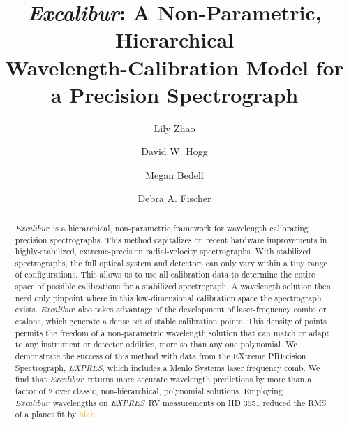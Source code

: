 \documentclass[modern]{aastex63}
\newcommand{\project}[1]{\textsl{#1}}
\newcommand{\name}{\project{Excalibur}}
\newcommand{\acronym}[1]{{\small{#1}}}
\newcommand{\expres}{\project{\acronym{EXPRES}}}
\newcommand{\lz}[1]{\textcolor{orange}{#1}}
\begin{document}
\title{\name:
  A Non-Parametric, Hierarchical \\
  Wavelength-Calibration Model for a Precision Spectrograph}


\author[0000-0002-3852-3590]{Lily Zhao}

\author[0000-0003-2866-9403]{David W. Hogg}

\author[0000-0001-9907-7742]{Megan Bedell}

\author[0000-0003-2221-0861]{Debra A. Fischer}

\begin{abstract}\noindent%
\name\ is a hierarchical, non-parametric framework for wavelength calibrating precision spectrographs.  This method capitalizes on recent hardware improvements in highly-stabilized, extreme-precision radial-velocity spectrographs.  With stabilized spectrographs, the full optical system and detectors can only vary within a tiny range of configurations.  This allows us to use all calibration data to determine the entire space of possible calibrations for a stabilized spectrograph.  A wavelength solution then need only pinpoint where in this low-dimensional calibration space the spectrograph exists.  \name\ also takes advantage of the development of laser-frequency combs or etalons, which generate a dense set of stable calibration points.  This density of points permits the freedom of a non-parametric wavelength solution that can match or adapt to any instrument or detector oddities, more so than any one polynomial.  We demonstrate the success of this method with data from the EXtreme PREcision Spectrograph, \expres, which includes a Menlo Systems laser frequency comb.  We find that \name\ returns more accurate wavelength predictions by more than a factor of 2 over classic, non-hierarchical, polynomial solutions.  Employing \name\ wavelengths on \expres\ RV measurements on HD 3651 reduced the RMS of a planet fit by \lz{blah}.
\end{abstract}
\end{document}
